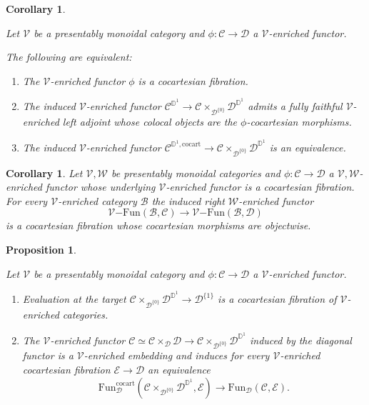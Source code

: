 \documentclass[10pt,oneside]{article}
\numberwithin{equation}{section} %
\numberwithin{figure}{section} %
\theoremstyle{plain}
\newtheorem{proposition}[theorem]{Proposition}
\newtheorem{corollary}[theorem]{Corollary}
\theoremstyle{definition}
\newcommand{\bD}{{\mathbb D}}
\newcommand{\mB}{{\mathcal B}}
\newcommand{\mC}{{\mathcal C}}
\newcommand{\mD}{{\mathcal D}}
\newcommand{\mE}{{\mathcal E}}
\newcommand{\mV}{{\mathcal V}}
\newcommand{\mW}{{\mathcal W}}
\newcommand{\Fun}{\mathrm{Fun}}
\newcommand{\cocart}{{\mathrm{cocart}}}
\begin{document}
\begin{corollary}\label{enrfibchar}

Let $\mV$ be a presentably monoidal category and $\phi: \mC \to \mD$
a $\mV$-enriched functor.

The following are equivalent:

\begin{enumerate}[\normalfont(1)]\setlength{\itemsep}{-2pt}
\item The $\mV$-enriched functor $\phi$ is a cocartesian fibration.

\item The induced $\mV$-enriched functor $\mC^{\bD^1} \to \mC \times_{\mD^{\{0\}}} \mD^{\bD^1}$ admits a fully faithful $\mV$-enriched left adjoint whose colocal objects are the $\phi$-cocartesian morphisms.

\item The induced $\mV$-enriched functor $\mC^{\bD^1, \cocart} \to \mC \times_{\mD^{\{0\}}} \mD^{\bD^1}$ is an equivalence.

\end{enumerate}
    
\end{corollary}

\begin{corollary}\label{enrcocartexp}
Let $\mV, \mW$ be presentably monoidal categories and $\phi: \mC \to \mD$ a $\mV,\mW$-enriched functor whose underlying $\mV$-enriched functor is a cocartesian fibration.
For every $\mV$-enriched category $\mB$ the induced right $\mW$-enriched functor
$${\mV\mathrm{-}\Fun}(\mB, \mC) \to {\mV\mathrm{-}\Fun}(\mB, \mD)$$ is a cocartesian fibration whose cocartesian morphisms are objectwise.
   
\end{corollary}

\begin{proposition}\label{enevolt}

Let $\mV$ be a presentably monoidal category and $\phi: \mC \to \mD$
a $\mV$-enriched functor.

\begin{enumerate}[\normalfont(1)]\setlength{\itemsep}{-2pt}
\item Evaluation at the target $\mC \times_{\mD^{\{0\}}} \mD^{\bD^1} \to \mD^{\{1\}}$ is a cocartesian fibration of $\mV$-enriched categories.

\item The $\mV$-enriched functor
$\mC \simeq \mC \times_{\mD} \mD \to \mC \times_{\mD^{\{0\}}} \mD^{\bD^1}$ induced by the diagonal functor is a $\mV$-enriched embedding and induces for every $\mV$-enriched cocartesian fibration $\mE \to \mD$ an equivalence
$$ \Fun^\cocart_\mD(\mC \times_{\mD^{\{0\}}} \mD^{\bD^1},\mE) \to \Fun_\mD(\mC, \mE).$$

\end{enumerate}

\end{proposition}
\end{document}
